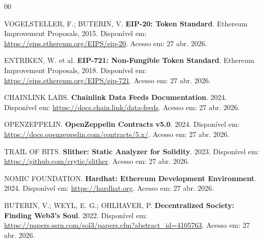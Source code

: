 \documentclass[
    12pt,
    a4paper,
    oneside,
    brazil,
    sumario=tradicional
]{abntex2}
\begin{document}
\begin{thebibliography}{00}

VOGELSTELLER, F.; BUTERIN, V\@.
\textbf{EIP-20: Token Standard}.
Ethereum Improvement Proposals, 2015.
Disponível em: \url{https://eips.ethereum.org/EIPS/eip-20}.
Acesso em: 27 abr. 2026.

ENTRIKEN, W\@. et al\@.
\textbf{EIP-721: Non-Fungible Token Standard}.
Ethereum Improvement Proposals, 2018.
Disponível em: \url{https://eips.ethereum.org/EIPS/eip-721}.
Acesso em: 27 abr. 2026.

CHAINLINK LABS.
\textbf{Chainlink Data Feeds Documentation}.
2024.
Disponível em: \url{https://docs.chain.link/data-feeds}.
Acesso em: 27 abr. 2026.

OPENZEPPELIN.
\textbf{OpenZeppelin Contracts v5.0}.
2024.
Disponível em: \url{https://docs.openzeppelin.com/contracts/5.x/}.
Acesso em: 27 abr. 2026.

TRAIL OF BITS.
\textbf{Slither: Static Analyzer for Solidity}.
2023.
Disponível em: \url{https://github.com/crytic/slither}.
Acesso em: 27 abr. 2026.

NOMIC FOUNDATION.
\textbf{Hardhat: Ethereum Development Environment}.
2024.
Disponível em: \url{https://hardhat.org}.
Acesso em: 27 abr. 2026.

BUTERIN, V\@.; WEYL, E\@. G\@.; OHLHAVER, P\@.
\textbf{Decentralized Society: Finding Web3's Soul}.
2022.
Disponível em: \url{https://papers.ssrn.com/sol3/papers.cfm?abstract_id=4105763}.
Acesso em: 27 abr. 2026.

\end{thebibliography}
\end{document}
